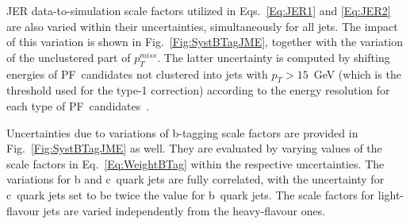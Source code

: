 JER data-to-simulation scale factors utilized in Eqs.~\ref{Eq:JER1} and \ref{Eq:JER2} are also varied within their uncertainties, simultaneously for all jets.
The impact of this variation is shown in Fig.~\ref{Fig:SystBTagJME}, together with the variation of the unclustered part of $p_{T}^{miss}$.
The latter uncertainty is computed by shifting energies of PF~candidates not clustered into jets with $p_T > 15$~GeV (which is the threshold used for the type-1 correction) according to the energy resolution for each type of PF~candidates~\cite{CMS-PAS-JME-16-004}.

Uncertainties due to variations of b-tagging scale factors are provided in Fig.~\ref{Fig:SystBTagJME} as well.
They are evaluated by varying values of the scale factors in Eq.~\ref{Eq:WeightBTag} within the respective uncertainties.
The variations for b and c~quark jets are fully correlated, with the uncertainty for c~quark jets set to be twice the value for b~quark jets.
The scale factors for light-flavour jets are varied independently from the heavy-flavour ones.

